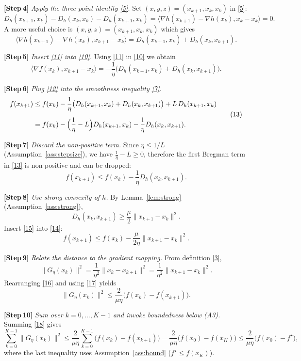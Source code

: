 \documentclass{article}
\newcommand{\grad}{\nabla}
\newcommand{\Breg}{D_{h}}
\begin{document}
\noindent\textbf{[Step 4]} \emph{Apply the three‑point identity \eqref{5}.}  
Set $(x,y,z)=(x_{k+1},x_k,x_k)$ in \eqref{5}:
\[
\Breg (x_{k+1},x_k)-\Breg (x_k,x_k)-\Breg (x_{k+1},x_k)
   =\langle \grad h(x_{k+1})-\grad h(x_k),x_k-x_k\rangle=0 .
\]
A more useful choice is $(x,y,z)=(x_{k+1},x_k,x_k)$ which gives
\[
\langle \grad h(x_{k+1})-\grad h(x_k),x_{k+1}-x_k\rangle
   =\Breg (x_{k+1},x_k)+\Breg (x_k,x_{k+1}) .
\tag{11}
\]

\noindent\textbf{[Step 5]} \emph{Insert \eqref{11} into \eqref{10}.}  
Using \eqref{11} in \eqref{10} we obtain
\[
\langle \grad f(x_k),x_{k+1}-x_k\rangle
   = -\frac{1}{\eta}\bigl(\Breg (x_{k+1},x_k)+\Breg (x_k,x_{k+1})\bigr).
\tag{12}
\]

\noindent\textbf{[Step 6]} \emph{Plug \eqref{12} into the smoothness inequality \eqref{7}.}  
\[
\begin{aligned}
f(x_{k+1})
&\le f(x_k)
   -\frac{1}{\eta}\bigl(\Breg (x_{k+1},x_k)+\Breg (x_k,x_{k+1})\bigr)
   +L\,\Breg (x_{k+1},x_k)\\[1ex]
&= f(x_k)
   -\Bigl(\frac{1}{\eta}-L\Bigr)\Breg (x_{k+1},x_k)
   -\frac{1}{\eta}\Breg (x_k,x_{k+1}) .
\end{aligned}
\tag{13}
\]

\noindent\textbf{[Step 7]} \emph{Discard the non‑positive term.}  
Since $\eta\le 1/L$ (Assumption~\ref{ass:stepsize}), we have $\frac{1}{\eta}-L\ge0$, therefore the first Bregman term in \eqref{13} is non‑positive and can be dropped:
\[
f(x_{k+1})\le f(x_k)-\frac{1}{\eta}\Breg (x_k,x_{k+1}).
\tag{14}
\]

\noindent\textbf{[Step 8]} \emph{Use strong convexity of $h$.}  
By Lemma~\ref{lem:strong} (Assumption~\ref{ass:strong}),
\[
\Breg (x_k,x_{k+1})\ge\frac{\mu}{2}\|x_{k+1}-x_k\|^{2}.
\tag{15}
\]
Insert \eqref{15} into \eqref{14}:
\[
f(x_{k+1})\le f(x_k)-\frac{\mu}{2\eta}\|x_{k+1}-x_k\|^{2}.
\tag{16}
\]

\noindent\textbf{[Step 9]} \emph{Relate the distance to the gradient mapping.}  
From definition \eqref{3},
\[
\|G_{\eta}(x_k)\|^{2}
   =\frac{1}{\eta^{2}}\|x_k-x_{k+1}\|^{2}
   =\frac{1}{\eta^{2}}\|x_{k+1}-x_k\|^{2}.
\tag{17}
\]
Rearranging \eqref{16} and using \eqref{17} yields
\[
\|G_{\eta}(x_k)\|^{2}
   \le \frac{2}{\mu\eta}\bigl(f(x_k)-f(x_{k+1})\bigr).
\tag{18}
\]

\noindent\textbf{[Step 10]} \emph{Sum over $k=0,\dots,K-1$ and invoke boundedness below (A3).}  
Summing \eqref{18} gives
\[
\sum_{k=0}^{K-1}\|G_{\eta}(x_k)\|^{2}
   \le \frac{2}{\mu\eta}\sum_{k=0}^{K-1}\bigl(f(x_k)-f(x_{k+1})\bigr)
   = \frac{2}{\mu\eta}\bigl(f(x_0)-f(x_K)\bigr)
   \le \frac{2}{\mu\eta}\bigl(f(x_0)-f^\star\bigr),
\tag{19}
\]
where the last inequality uses Assumption~\ref{ass:bound} ($f^\star\le f(x_K)$).
\end{document}
